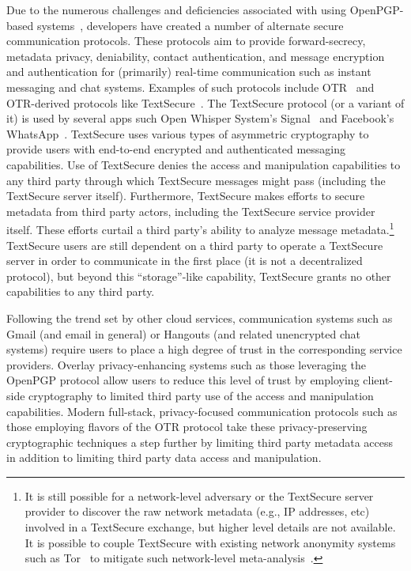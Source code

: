 Due to the numerous challenges and deficiencies associated with using
OpenPGP-based systems~\cite{borisov2004, green-pgp, whitten1999},
developers have created a number of alternate secure communication
protocols. These protocols aim to provide forward-secrecy, metadata
privacy, deniability, contact authentication, and message encryption
and authentication for (primarily) real-time communication such as
instant messaging and chat systems. Examples of such protocols include
OTR~\cite{otr-v3} and OTR-derived protocols like
TextSecure~\cite{otr-advanced-ratchet}. The TextSecure protocol (or a
variant of it) is used by several apps such Open Whisper System's
Signal~\cite{openwhisper} and Facebook's
WhatsApp~\cite{whatsapp}. TextSecure uses various types of asymmetric
cryptography to provide users with end-to-end encrypted and
authenticated messaging capabilities. Use of TextSecure denies the
access and manipulation capabilities to any third party through which
TextSecure messages might pass (including the TextSecure server
itself). Furthermore, TextSecure makes efforts to secure metadata from
third party actors, including the TextSecure service provider
itself. These efforts curtail a third party's ability to analyze
message metadata.\footnote{It is still possible for a network-level
  adversary or the TextSecure server provider to discover the raw
  network metadata (e.g., IP addresses, etc) involved in a TextSecure
  exchange, but higher level details are not available. It is possible
  to couple TextSecure with existing network anonymity systems such as
  Tor~\cite{dingledine2004} to mitigate such network-level
  meta-analysis~\cite{intercept-chatting}.} TextSecure users are still
dependent on a third party to operate a TextSecure server in order to
communicate in the first place (it is not a decentralized protocol),
but beyond this ``storage''-like capability, TextSecure grants no
other capabilities to any third party.

Following the trend set by other cloud services, communication systems
such as Gmail (and email in general) or Hangouts (and related
unencrypted chat systems) require users to place a high degree of
trust in the corresponding service providers. Overlay
privacy-enhancing systems such as those leveraging the OpenPGP
protocol allow users to reduce this level of trust by employing
client-side cryptography to limited third party use of the access and
manipulation capabilities. Modern full-stack, privacy-focused
communication protocols such as those employing flavors of the OTR
protocol take these privacy-preserving cryptographic techniques a step
further by limiting third party metadata access in addition to
limiting third party data access and manipulation.

